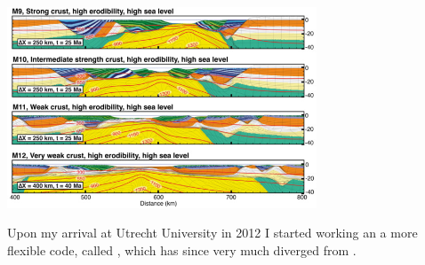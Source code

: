 \begin{itemize}
\begin{center}
\includegraphics[height=6cm]{images/mycodes/thhu19_img}
\end{center}



\end{itemize}

Upon my arrival at Utrecht University in 2012 I started working an a more flexible code, called \elefant, 
which has since very much diverged from \fantom.

